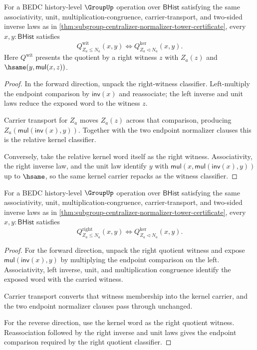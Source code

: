 \begin{theorem}
\label{thm:subgroup-centralizer-quotient-kernel-witness-classifier-iff}
For a BEDC history-level $\GroupUp$ operation over $\mathsf{BHist}$
satisfying the same associativity, unit, multiplication-congruence,
carrier-transport, and two-sided inverse laws as in
\autoref{thm:subgroup-centralizer-normalizer-tower-certificate}, every
$x,y:\mathsf{BHist}$ satisfies
$$
Q^{\mathrm{wit}}_{Z_a\leq N_a}(x,y)\Longleftrightarrow
Q^{\mathrm{ker}}_{Z_a\triangleleft N_a}(x,y).
$$
Here $Q^{\mathrm{wit}}$ presents the quotient by a right witness $z$ with
$Z_a(z)$ and $\hsame(y,\mathsf{mul}(x,z))$.
\end{theorem}
\begin{proof}
In the forward direction, unpack the right-witness classifier. Left-multiply
the endpoint comparison by $\mathsf{inv}(x)$ and reassociate; the left inverse
and unit laws reduce the exposed word to the witness $z$.

Carrier transport for $Z_a$ moves $Z_a(z)$ across that comparison, producing
$Z_a(\mathsf{mul}(\mathsf{inv}(x),y))$. Together with the two endpoint
normalizer clauses this is the relative kernel classifier.

Conversely, take the relative kernel word itself as the right witness.
Associativity, the right inverse law, and the unit law identify
$y$ with $\mathsf{mul}(x,\mathsf{mul}(\mathsf{inv}(x),y))$ up to $\hsame$,
so the same kernel carrier repacks as the witness classifier.
\end{proof}

\begin{theorem}
\label{thm:subgroup-centralizer-right-quotient-classifier-kernel-iff}
For a BEDC history-level $\GroupUp$ operation over $\mathsf{BHist}$
satisfying the same associativity, unit, multiplication-congruence,
carrier-transport, and two-sided inverse laws as in
\autoref{thm:subgroup-centralizer-normalizer-tower-certificate}, every
$x,y:\mathsf{BHist}$ satisfies
$$
Q^{\mathrm{right}}_{Z_a\leq N_a}(x,y)\Longleftrightarrow
Q^{\mathrm{ker}}_{Z_a\triangleleft N_a}(x,y).
$$
\end{theorem}
\begin{proof}
For the forward direction, unpack the right quotient witness and expose
$\mathsf{mul}(\mathsf{inv}(x),y)$ by multiplying the endpoint comparison on
the left. Associativity, left inverse, unit, and multiplication congruence
identify the exposed word with the carried witness.

Carrier transport converts that witness membership into the kernel carrier,
and the two endpoint normalizer clauses pass through unchanged.

For the reverse direction, use the kernel word as the right quotient witness.
Reassociation followed by the right inverse and unit laws gives the endpoint
comparison required by the right quotient classifier.
\end{proof}

